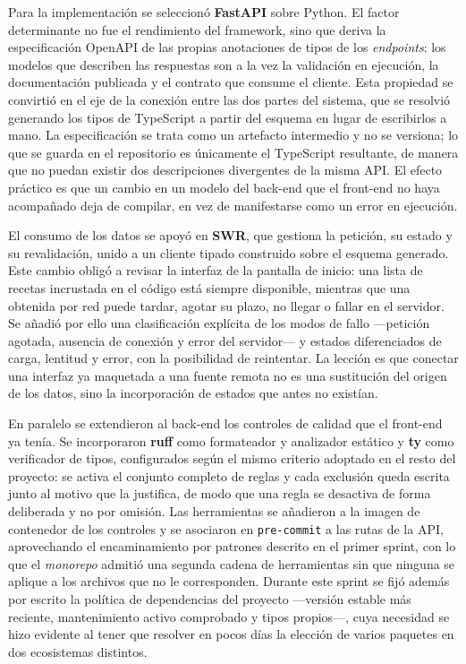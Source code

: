 Para la implementación se seleccionó \textbf{FastAPI} sobre Python. El factor
determinante no fue el rendimiento del framework, sino que deriva la
especificación OpenAPI de las propias anotaciones de tipos de los
\textit{endpoints}: los modelos que describen las respuestas son a la vez la
validación en ejecución, la documentación publicada y el contrato que consume el
cliente. Esta propiedad se convirtió en el eje de la conexión entre las dos
partes del sistema, que se resolvió generando los tipos de TypeScript a partir
del esquema en lugar de escribirlos a mano. La especificación se trata como un
artefacto intermedio y no se versiona; lo que se guarda en el repositorio es
únicamente el TypeScript resultante, de manera que no puedan existir dos
descripciones divergentes de la misma API. El efecto práctico es que un cambio
en un modelo del back-end que el front-end no haya acompañado deja de compilar,
en vez de manifestarse como un error en ejecución.

El consumo de los datos se apoyó en \textbf{SWR}, que gestiona la petición, su
estado y su revalidación, unido a un cliente tipado construido sobre el esquema
generado. Este cambio obligó a revisar la interfaz de la pantalla de inicio: una
lista de recetas incrustada en el código está siempre disponible, mientras que
una obtenida por red puede tardar, agotar su plazo, no llegar o fallar en el
servidor. Se añadió por ello una clasificación explícita de los modos de fallo
—petición agotada, ausencia de conexión y error del servidor— y estados
diferenciados de carga, lentitud y error, con la posibilidad de reintentar. La
lección es que conectar una interfaz ya maquetada a una fuente remota no es una
sustitución del origen de los datos, sino la incorporación de estados que antes
no existían.

En paralelo se extendieron al back-end los controles de calidad que el front-end
ya tenía. Se incorporaron \textbf{ruff} como formateador y analizador estático y
\textbf{ty} como verificador de tipos, configurados según el mismo criterio
adoptado en el resto del proyecto: se activa el conjunto completo de reglas y
cada exclusión queda escrita junto al motivo que la justifica, de modo que una
regla se desactiva de forma deliberada y no por omisión. Las herramientas se
añadieron a la imagen de contenedor de los controles y se asociaron en
\texttt{pre-commit} a las rutas de la API, aprovechando el encaminamiento por
patrones descrito en el primer sprint, con lo que el \textit{monorepo} admitió
una segunda cadena de herramientas sin que ninguna se aplique a los archivos que
no le corresponden. Durante este sprint se fijó además por escrito la política de
dependencias del proyecto —versión estable más reciente, mantenimiento activo
comprobado y tipos propios—, cuya necesidad se hizo evidente al tener que
resolver en pocos días la elección de varios paquetes en dos ecosistemas
distintos.

